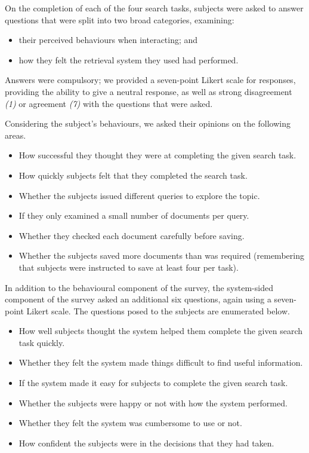 On the completion of each of the four search tasks, subjects were asked to answer questions that were split into two broad categories, examining:

\begin{itemize}
    \item{their perceived behaviours when interacting; and}
    \item{how they felt the retrieval system they used had performed.}
\end{itemize}

Answers were compulsory; we provided a seven-point Likert scale for responses, providing the ability to give a neutral response, as well as strong disagreement \emph{(1)} or agreement \emph{(7)} with the questions that were asked.

Considering the subject's behaviours, we asked their opinions on the following areas.

\begin{itemize}
    \item{ How successful they thought they were at completing the given search task.}
    \item{ How quickly subjects felt that they completed the search task.}
    \item{ Whether the subjects issued different queries to explore the topic.}
    \item{ If they only examined a small number of documents per query.}
    \item{ Whether they checked each document carefully before saving.}
    \item{ Whether the subjects saved more documents than was required (remembering that subjects were instructed to save at least four per task).}
\end{itemize}

In addition to the behavioural component of the survey, the system-sided component of the survey asked an additional six questions, again using a seven-point Likert scale. The questions posed to the subjects are enumerated below.

\begin{itemize}
    \item{ How well subjects thought the system helped them complete the given search task quickly.}
    \item{ Whether they felt the system made things difficult to find useful information.}
    \item{ If the system made it easy for subjects to complete the given search task.}
    \item{ Whether the subjects were happy or not with how the system performed.}
    \item{ Whether they felt the system was cumbersome to use or not.}
    \item{ How confident the subjects were in the decisions that they had taken.}
\end{itemize}


